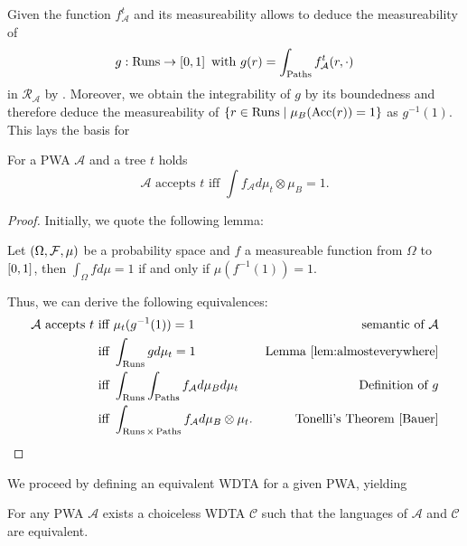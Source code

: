 Given the function $f_{\mathcal{A}}^{t}$ and its measureability allows to
deduce the measureability of
\begin{equation*}
  g:\operatorname{Runs}\rightarrow\left[0,1\right]\text{ with } 
    g(r) = \int_{\operatorname{Paths}}f_{\mathcal{A}}^{t}(r, \cdot)
\end{equation*}
in $\mathcal{R}_{\mathcal{A}}$ by \cite[Lemma 23.1]{Bauer}. Moreover, we obtain
the integrability of $g$ by its boundedness and therefore deduce the 
measureability of $\left\{r\in\operatorname{Runs}\mid\mu_{B}(\operatorname{Acc}(r)) = 1 \right\}$ as 
$g^{-1}(1)$. This lays the basis for 
\begin{proposition}
  \cite[Proposition 42]{RandAutoInfTrees}
  For a \ac{PWA} $\mathcal{A}$ and a tree $t$ holds
  \begin{equation*}
    \mathcal{A}\text{ accepts }t
    \text{ iff }
    \int f_{\mathcal{A}} d\mu_{t}\otimes\mu_{B} = 1.
  \end{equation*}
  \label{prop:pwabyf}
\end{proposition}
\begin{proof}
  Initially, we quote the following lemma:
  \begin{lemma}
    \cite[Lemma 40]{RandAutoInfTrees} Let $\left(\Omega,\mathcal{F},\mu\right)$ be
    a probability space and $f$ a measureable function from $\Omega$ to
    $\left[0,1\right]$, then $\int_{\Omega}f d\mu = 1$ if and only if 
    $\mu(f^{-1}(1)) = 1$.
    \label{lem:almosteverywhere}
  \end{lemma}
  Thus, we can derive the following equivalences:
  \begin{align*}
    \mathcal{A}\text{ accepts }t
     &\text{ iff }\mu_{t}(g^{-1}(1)) = 1&\text{semantic of }\mathcal{A}\\
    &\text{ iff }\int_{\Runs} g d\mu_{t} = 1
     &\text{Lemma \ref{lem:almosteverywhere}}\\
    &\text{ iff }\int_{\Runs}\int_{\Paths} f_{\mathcal{A}} d\mu_{B} d\mu_{t}
     &\text{Definition of }g\\
    &\text{ iff }\int_{\Runs\times\Paths}f_{\mathcal{A}}d\mu_{B}\otimes\mu_{t}.
     &\text{Tonelli's Theorem \cite[Theorem 23.6]{Bauer}}
  \end{align*}
\end{proof}
We proceed by defining an equivalent \ac{WDTA} for a given \ac{PWA}, yielding
\begin{theorem}
  For any \ac{PWA} $\mathcal{A}$ exists a choiceless \ac{WDTA} $\mathcal{C}$
  such that the languages of $\mathcal{A}$ and $\mathcal{C}$ are equivalent.
\end{theorem}
